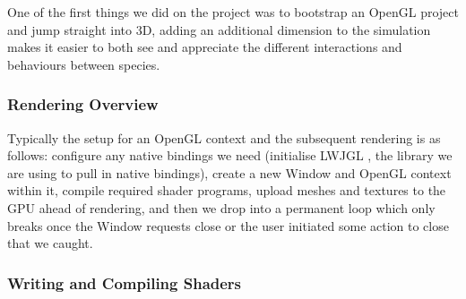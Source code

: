 \documentclass{article}
\begin{document}
\begin{multicols}{2}
            One of the first things we did on the project was to bootstrap an OpenGL project and jump straight into 3D, adding an additional dimension to the simulation makes it easier to both see and appreciate the different interactions and behaviours between species.

            \subsubsection{Rendering Overview}

            Typically the setup for an OpenGL context and the subsequent rendering is as follows: configure any native bindings we need (initialise LWJGL \cite{LWJGL}, the library we are using to pull in native bindings), create a new Window and OpenGL context within it, compile required shader programs, upload meshes and textures to the GPU ahead of rendering, and then we drop into a permanent loop which only breaks once the Window requests close or the user initiated some action to close that we caught.

            \subsubsection{Writing and Compiling Shaders}


    \end{multicols}

    \newpage
\end{document}
